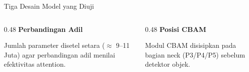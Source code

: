 \documentclass[aspectratio=169,10pt]{beamer}
\begin{document}
\begin{frame}{Tiga Desain Model yang Diuji}
    \centering
    \small
    
    \vspace{2.5em}
    \normalsize
    \begin{columns}[t]
        \begin{column}{0.48\textwidth}
            \centering\textbf{Perbandingan Adil}\par
            \vspace{0.3em}
            \small Jumlah parameter disetel setara ($\approx$ 9--11 Juta) agar perbandingan adil menilai efektivitas attention.
        \end{column}
        \begin{column}{0.48\textwidth}
            \centering\textbf{Posisi CBAM}\par
            \vspace{0.3em}
            \small Modul CBAM disisipkan pada bagian neck (P3/P4/P5) sebelum detektor objek.
        \end{column}
    \end{columns}
\end{frame}
\end{document}
